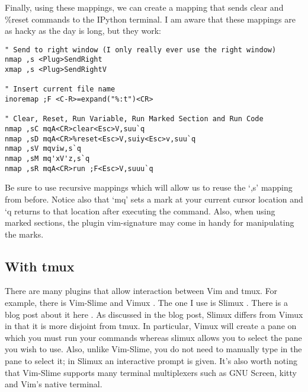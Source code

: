 \documentclass[10pt]{article}
\begin{document}
Finally, using these mappings, we can create a mapping that sends clear and
\%reset commands to the IPython terminal. I am aware that these mappings are as
hacky as the day is long, but they work:
\begin{lstlisting}
" Send to right window (I only really ever use the right window)
nmap ,s <Plug>SendRight
xmap ,s <Plug>SendRightV

" Insert current file name
inoremap ;F <C-R>=expand("%:t")<CR>

" Clear, Reset, Run Variable, Run Marked Section and Run Code
nmap ,sC mqA<CR>clear<Esc>V,suu`q 
nmap ,sD mqA<CR>%reset<Esc>V,suiy<Esc>v,suu`q
nmap ,sV mqviw,s`q
nmap ,sM mq'xV'z,s`q
nmap ,sR mqA<CR>run ;F<Esc>V,suuu`q
\end{lstlisting}
Be sure to use recursive mappings which will allow us to reuse the `,s' mapping
from before. Notice also that `mq' sets a mark at your current cursor location
and `q returns to that location after executing the command. Also, when using
marked sections, the plugin vim-signature \cite{kshenoy2015signature} may come
in handy for manipulating the marks.

\subsection{With tmux}
There are many plugins that allow interaction between Vim and tmux. For example,
there is Vim-Slime \cite{jpalardy2012slime} and Vimux \cite{benmills2009vimux}.
The one I use is Slimux \cite{esamattis2015slimux}. There is a blog post about
it here \cite{suuronen2012slimux}. As discussed in the blog post, Slimux differs
from Vimux in that it is more disjoint from tmux. In particular, Vimux will
create a pane on which you must run your commands whereas slimux allows you to
select the pane you wish to use. Also, unlike Vim-Slime, you do not need to
manually type in the pane to select it; in Slimux an interactive prompt is
given. It's also worth noting that Vim-Slime supports many terminal multiplexers
such as GNU Screen, kitty and Vim's native terminal.\\
\end{document}
